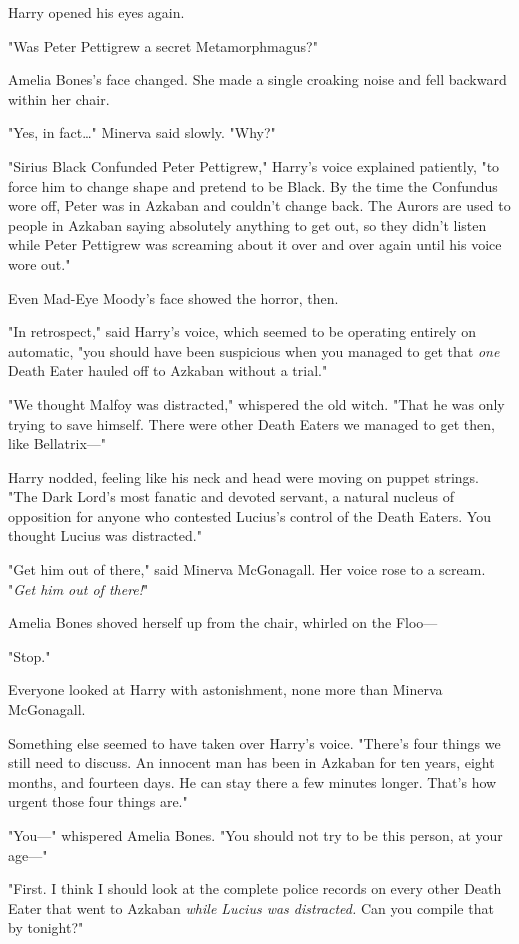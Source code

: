 Harry opened his eyes again.

"Was Peter Pettigrew a secret Metamorphmagus?"

Amelia Bones's face changed. She made a single croaking noise and fell backward
within her chair.

"Yes, in fact…" Minerva said slowly. "Why?"

"Sirius Black Confunded Peter Pettigrew," Harry's voice explained patiently,
"to force him to change shape and pretend to be Black. By the time the
Confundus wore off, Peter was in Azkaban and couldn't change back. The Aurors
are used to people in Azkaban saying absolutely anything to get out, so they
didn't listen while Peter Pettigrew was screaming about it over and over again
until his voice wore out."

Even Mad-Eye Moody's face showed the horror, then.

"In retrospect," said Harry's voice, which seemed to be operating entirely on
automatic, "you should have been suspicious when you managed to get that
\emph{one} Death Eater hauled off to Azkaban without a trial."

"We thought Malfoy was distracted," whispered the old witch. "That he was only
trying to save himself. There were other Death Eaters we managed to get then,
like Bellatrix---"

Harry nodded, feeling like his neck and head were moving on puppet strings.
"The Dark Lord's most fanatic and devoted servant, a natural nucleus of
opposition for anyone who contested Lucius's control of the Death Eaters. You
thought Lucius was distracted."

"Get him out of there," said Minerva McGonagall. Her voice rose to a scream.
"\emph{Get him out of there!}"

Amelia Bones shoved herself up from the chair, whirled on the Floo---

"Stop."

Everyone looked at Harry with astonishment, none more than Minerva McGonagall.

Something else seemed to have taken over Harry's voice. "There's four things we
still need to discuss. An innocent man has been in Azkaban for ten years, eight
months, and fourteen days. He can stay there a few minutes longer. That's how
urgent those four things are."

"You---" whispered Amelia Bones. "You should not try to be this person, at your
age---"

"First. I think I should look at the complete police records on every other
Death Eater that went to Azkaban \emph{while Lucius was distracted.} Can you
compile that by tonight?"

